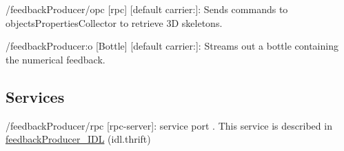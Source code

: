 \begin{DoxyItemize}
\item /feedback\+Producer/opc \mbox{[}rpc\mbox{]} \mbox{[}default carrier\+:\mbox{]}\+: Sends commands to objects\+Properties\+Collector to retrieve 3D skeletons.
\item /feedback\+Producer\+:o \mbox{[}Bottle\mbox{]} \mbox{[}default carrier\+:\mbox{]}\+: Streams out a bottle containing the numerical feedback.
\end{DoxyItemize}\hypertarget{group__skeletonViewer_services_sec}{}\subsection{Services}\label{group__skeletonViewer_services_sec}

\begin{DoxyItemize}
\item /feedback\+Producer/rpc \mbox{[}rpc-\/server\mbox{]}\+: service port . This service is described in \mbox{\hyperlink{classfeedbackProducer__IDL}{feedback\+Producer\+\_\+\+I\+DL}} (idl.\+thrift) 
\end{DoxyItemize}